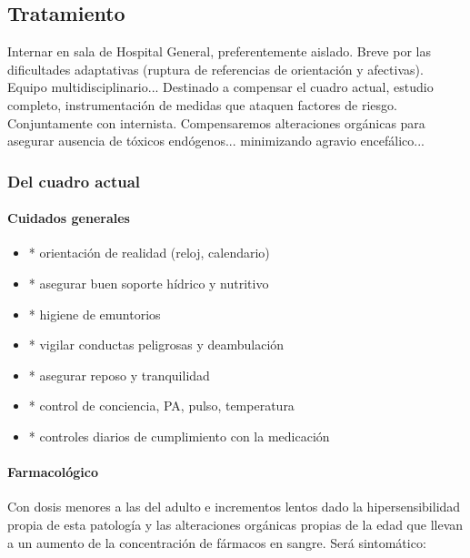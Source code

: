\documentclass{scrbook}
\begin{document}
\subsection*{Tratamiento}

Internar en sala de Hospital General, preferentemente aislado. Breve por las dificultades adaptativas (ruptura de referencias de orientación y afectivas). Equipo multidisciplinario... Destinado a compensar el cuadro actual, estudio completo, instrumentación de medidas que ataquen factores de riesgo. Conjuntamente con internista. Compensaremos alteraciones orgánicas para asegurar ausencia de tóxicos endógenos... minimizando agravio encefálico...

\subsubsection{Del cuadro actual}
\paragraph{Cuidados generales}
\begin{itemize}
	\item * orientación de realidad (reloj, calendario)
	\item * asegurar buen soporte hídrico y nutritivo
	\item * higiene de emuntorios
	\item * vigilar conductas peligrosas y deambulación
	\item * asegurar reposo y tranquilidad
	\item * control de conciencia, PA, pulso, temperatura
	\item * controles diarios de cumplimiento con la medicación
\end{itemize}
\paragraph{Farmacológico}
Con dosis menores a las del adulto e incrementos lentos dado la hipersensibilidad propia de esta patología y las alteraciones orgánicas propias de la edad que llevan a un aumento de la concentración de fármacos en sangre. Será sintomático:
\end{document}
